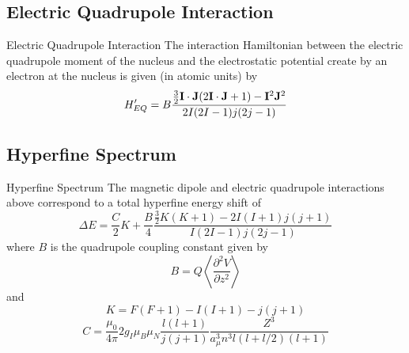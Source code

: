 \documentclass[xcolor=dvipsnames,t]{beamer}
\begin{document}
    \subsection{Electric Quadrupole Interaction}
    \begin{frame}{Electric Quadrupole Interaction} 
    The interaction Hamiltonian between the electric quadrupole moment of the
    nucleus and the electrostatic potential create by an electron at the nucleus is 
    given (in atomic units) by
    \begin{equation}
        H'_{EQ} = B \frac{\frac{3}{2}{\bf I} \cdot {\bf J} (2{\bf I}\cdot {\bf J} + 1) - 
                        {\bf I}^2 {\bf J}^2} {2I(2I-1)j(2j-1)}    
    \end{equation}
    \end{frame} 

    \subsection{Hyperfine Spectrum}
    \begin{frame}{Hyperfine Spectrum} 
    The magnetic dipole and electric quadrupole interactions above correspond to 
    a total hyperfine energy shift of
    \begin{equation}
        \Delta E = \frac{C}{2}K + \frac{B}{4} 
                   \frac{\frac{3}{2}K(K+1)-2I(I+1)j(j+1)}{I(2I-1)j(2j-1)}
    \end{equation}
    where $B$ is the quadrupole coupling constant given by
    \begin{equation}
        B = Q \left \langle \frac{\partial^2 V}{\partial z^2} \right \rangle
    \end{equation}
    and
    \begin{equation}
        K = F(F+1) - I(I+1) - j(j+1)
    \end{equation}
    \begin{equation}
         C = \frac{\mu_0}{4\pi} 2g_I \mu_B \mu_N \frac{l(l+1)}{j(j+1)}
            \frac{Z^3}{a_{\mu}^{3} n^3 l (l + l/2)(l+1)} 
    \end{equation}
    \end{frame} 
\end{document}
